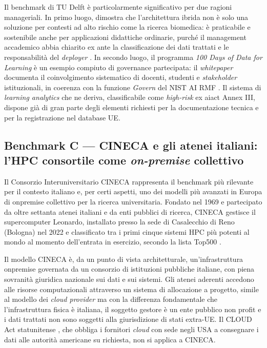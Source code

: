 Il benchmark di TU Delft è particolarmente significativo per due ragioni manageriali. In
primo luogo, dimostra che l'architettura ibrida non è solo una soluzione per contesti
ad alto rischio come la ricerca biomedica: è praticabile e sostenibile anche per
applicazioni didattiche ordinarie, purché il management accademico abbia chiarito ex ante
la classificazione dei dati trattati e le responsabilità del \textit{deployer}
\parencite{HohmannKollar2025}. In secondo luogo, il programma \textit{100 Days of
Data for Learning} è un esempio compiuto di governance partecipata: il
\textit{whitepaper} documenta il coinvolgimento sistematico di docenti, studenti e
\textit{stakeholder} istituzionali, in coerenza con la funzione \textit{Govern} del NIST
AI RMF \parencite{NIST_AI_RMF}. Il sistema di \textit{learning analytics} che ne
deriva, classificabile come \textit{high-risk} ex \gls{aiact} Annex III, dispone già di
gran parte degli elementi richiesti per la documentazione tecnica e per la registrazione
nel database UE.

\subsection{Benchmark C --- CINECA e gli atenei italiani: l'HPC consortile come
\textit{on-premise} collettivo}

Il Consorzio Interuniversitario CINECA rappresenta il benchmark più rilevante per il
contesto italiano e, per certi aspetti, uno dei modelli più avanzati in Europa di
\gls{onpremise} collettivo per la ricerca universitaria. Fondato nel 1969 e
partecipato da oltre settanta atenei italiani e da enti pubblici di ricerca, CINECA
gestisce il supercomputer Leonardo, installato presso la sede di Casalecchio di
Reno (Bologna) nel 2022 e classificato tra i primi cinque sistemi HPC più potenti al mondo
al momento dell'entrata in esercizio, secondo la lista Top500 \parencite{EuroHPC_Leonardo}.

Il modello CINECA è, da un punto di vista architetturale, un'infrastruttura
\gls{onpremise} governata da un consorzio di istituzioni pubbliche italiane, con
piena sovranità giuridica nazionale sui dati e sui sistemi. Gli atenei aderenti accedono
alle risorse computazionali attraverso un sistema di allocazione a progetto, simile al
modello dei \textit{cloud provider} ma con la differenza fondamentale che l'infrastruttura
fisica è italiana, il soggetto gestore è un ente pubblico non profit e i dati trattati
non sono soggetti alla giurisdizione di stati extra-UE. Il CLOUD Act statunitense
\parencite{CLOUDAct_Wire2025}, che obbliga i fornitori \textit{cloud} con sede negli USA
a consegnare i dati alle autorità americane su richiesta, non si applica a CINECA.

